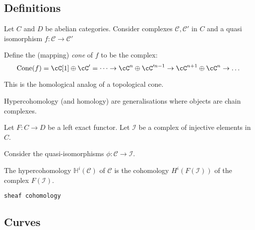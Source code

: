 
\subsection{Definitions}
Let \(C\) and \(D\) be abelian categories. Consider complexes \(\mathcal{C}, \mathcal{C}'\) in \(C\) 
and a quasi isomorphism \(f : \mathcal{C} \rightarrow \mathcal{C}'\)

\begin{defn} Define the (mapping) \emph{cone} of \(f\) to be the complex:
\[ \mathrm{Cone}(f)= \cC[1] \oplus \cC' = \dots \rightarrow \cC^{n} \oplus \cC'^{n-1} \rightarrow \cC^{n+1} \oplus \cC^{n} \rightarrow \dots \]
\end{defn}
This is the homological analog of a topological cone.

Hypercohomology (and homology) are generalisations where objects are chain complexes. 

Let \(F : C \rightarrow D\) be a left exact functor.  Let \( \mathcal{I}\) be a complex of injective elements in \(C\).

Consider the quasi-isomorphisms \( \phi : \mathcal{C} \rightarrow \mathcal{I}\).

\begin{defn}[Hypercohomology]
The hypercohomology \( \mathbb{H}^i(\mathcal{C})\) of \(\mathcal{C}\) is the cohomology \(H^i(F(\mathcal{I}))\) of the complex \(F(\mathcal{I})\).
\end{defn}
\texttt{sheaf cohomology}

\subsection{Curves}

